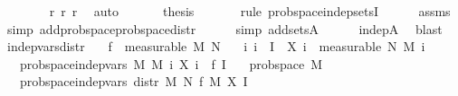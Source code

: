 \begin{isabellebody}
\ \ \ \ \ \ \isamarkupfalse%
\ r{}\ r{}\ r{}\ \isamarkupfalse%
\ auto\isanewline
\ \ \isamarkupfalse%
\isanewline
\isanewline
\ \ \isamarkupfalse%
\ {\isacharquery}{\kern0pt}thesis\ \isanewline
\ \ \ \ \isamarkupfalse%
\ {\isacharparenleft}{\kern0pt}rule\ prob{\isacharunderscore}{\kern0pt}space{\isachardot}{\kern0pt}indep{\isacharunderscore}{\kern0pt}setsI{\isacharparenright}{\kern0pt}\isanewline
\ \ \ \ \isamarkupfalse%
\ assms\ \isamarkupfalse%
\ {\isacharparenleft}{\kern0pt}simp\ add{\isacharcolon}{\kern0pt}prob{\isacharunderscore}{\kern0pt}space{\isachardot}{\kern0pt}prob{\isacharunderscore}{\kern0pt}space{\isacharunderscore}{\kern0pt}distr{\isacharparenright}{\kern0pt}\isanewline
\ \ \ \ \isamarkupfalse%
\ {\isacharparenleft}{\kern0pt}simp\ add{\isacharcolon}{\kern0pt}sets{\isacharunderscore}{\kern0pt}A{\isacharparenright}{\kern0pt}\isanewline
\ \ \ \ \isamarkupfalse%
\ indep{\isacharunderscore}{\kern0pt}A\ \isamarkupfalse%
\ blast\isanewline
{}\isamarkupfalse%
%
\endisatagproof
{\isafoldproof}%
%
\isadelimproof
\isanewline
%
\endisadelimproof
\isanewline
{}\isamarkupfalse%
\ indep{\isacharunderscore}{\kern0pt}vars{\isacharunderscore}{\kern0pt}distr{\isacharcolon}{\kern0pt}\isanewline
\ \ \ {\isachardoublequoteopen}f\ {\isasymin}\ measurable\ M\ N{\isachardoublequoteclose}\isanewline
\ \ \ {\isachardoublequoteopen}{\isasymAnd}i{\isachardot}{\kern0pt}\ i\ {\isasymin}\ I\ {\isasymLongrightarrow}\ X{\isacharprime}{\kern0pt}\ i\ {\isasymin}\ measurable\ N\ {\isacharparenleft}{\kern0pt}M{\isacharprime}{\kern0pt}\ i{\isacharparenright}{\kern0pt}{\isachardoublequoteclose}\isanewline
\ \ \ {\isachardoublequoteopen}prob{\isacharunderscore}{\kern0pt}space{\isachardot}{\kern0pt}indep{\isacharunderscore}{\kern0pt}vars\ M\ M{\isacharprime}{\kern0pt}\ {\isacharparenleft}{\kern0pt}{\isasymlambda}i{\isachardot}{\kern0pt}\ {\isacharparenleft}{\kern0pt}X{\isacharprime}{\kern0pt}\ i{\isacharparenright}{\kern0pt}\ {\isasymcirc}\ f{\isacharparenright}{\kern0pt}\ I{\isachardoublequoteclose}\isanewline
\ \ \ {\isachardoublequoteopen}prob{\isacharunderscore}{\kern0pt}space\ M{\isachardoublequoteclose}\isanewline
\ \ \ {\isachardoublequoteopen}prob{\isacharunderscore}{\kern0pt}space{\isachardot}{\kern0pt}indep{\isacharunderscore}{\kern0pt}vars\ {\isacharparenleft}{\kern0pt}distr\ M\ N\ f{\isacharparenright}{\kern0pt}\ M{\isacharprime}{\kern0pt}\ X{\isacharprime}{\kern0pt}\ I{\isachardoublequoteclose}\isanewline

\end{isabellebody}
